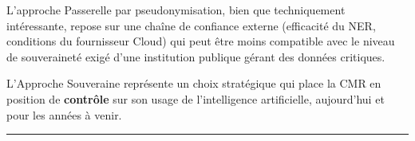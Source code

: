 \documentclass[12pt, a4paper]{report}
\begin{document}
L'approche Passerelle par pseudonymisation, bien que techniquement
intéressante, repose sur une chaîne de confiance externe (efficacité du
NER, conditions du fournisseur Cloud) qui peut être moins compatible avec
le niveau de souveraineté exigé d'une institution publique gérant des
données critiques.

L'Approche Souveraine représente un choix stratégique qui place la CMR
en position de \textbf{contrôle} sur son usage de l'intelligence
artificielle, aujourd'hui et pour les années à venir.

\vspace{1cm}
\noindent\rule{10cm}{0.4pt}
\end{document}
